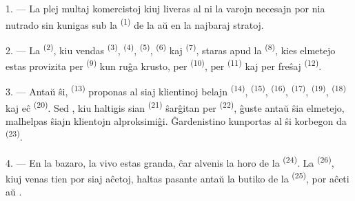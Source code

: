 
\VUsaut{4.0mm}
\VUsaut{3.0mm}

\VUsaut{3.0mm}

1. --- La plej multaj komercistoj kiuj liveras al ni la varojn necesajn por nia
nutrado sin kunigas sub la  \textsuperscript{(1)} de la
 aŭ en la najbaraj stratoj.

2. --- La  \textsuperscript{(2)}, kiu vendas
 \textsuperscript{(3)}, 
\textsuperscript{(4)},  \textsuperscript{(5)},
 \textsuperscript{(6)} kaj 
\textsuperscript{(7)}, staras apud la 
\textsuperscript{(8)}, kies elmetejo estas provizita per  \textsuperscript{(9)} kun ruĝa krusto, per 
\textsuperscript{(10)}, per  \textsuperscript{(11)} kaj
per freŝaj  \textsuperscript{(12)}.

3. --- Antaŭ ŝi,  \textsuperscript{(13)} proponas al
siaj klientinoj belajn  \textsuperscript{(14)},
 \textsuperscript{(15)}, 
\textsuperscript{(16)},  \textsuperscript{(17)},
 \textsuperscript{(19)}, 
\textsuperscript{(18)} kaj eĉ  \textsuperscript{(20)}. Sed
, kiu haltigis sian 
\textsuperscript{(21)} ŝarĝitan per 
\textsuperscript{(22)}, ĝuste antaŭ ŝia elmetejo, malhelpas ŝiajn klientojn
alproksimiĝi. Ĝardenistino kunportas al ŝi korbegon da 
\textsuperscript{(23)}.

\VUsaut{4.0mm}
\VUsaut{3.0mm}

4. --- En la bazaro, la vivo estas granda, ĉar alvenis la horo de la
 \textsuperscript{(24)}. La 
\textsuperscript{(26)}, kiuj venas tien por siaj aĉetoj, haltas pasante antaŭ la
butiko de la  \textsuperscript{(25)}, por aĉeti
 aŭ .

